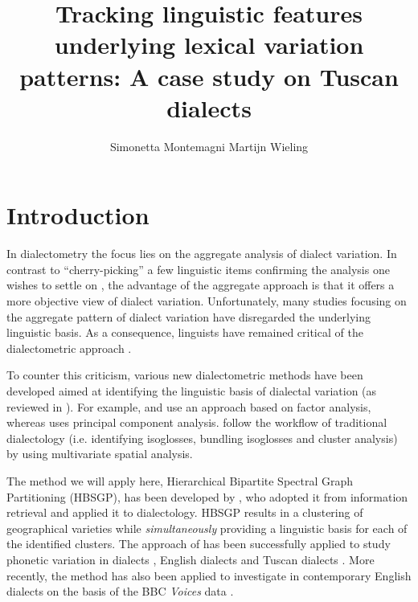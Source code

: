 \documentclass[output=paper]{LSP/langsci}
\author{Simonetta Montemagni\affiliation{Istituto di Linguistica Computazionale “Antonio Zampolli”, ILC-CNR} \lastand Martijn Wieling\affiliation{University of Groningen, CLCG}}
\title{Tracking linguistic features underlying lexical variation patterns: {A} case study on {T}uscan dialects}
\begin{document}
 
 
% 

% 
% 
% 
% 

\section{Introduction}
In dialectometry \citep{seguy_relation_1971} the focus lies on the aggregate analysis of dialect variation. In contrast to “cherry-picking” a few linguistic items confirming the analysis one wishes to settle on \citep{nerbonne_data-driven_2009}, the advantage of the aggregate approach is that it offers a more objective view of dialect variation. Unfortunately, many studies focusing on the aggregate pattern of dialect variation have disregarded the underlying linguistic basis. As a consequence, linguists have remained critical of the dialectometric approach \citep{schneider_qualitative_1988,woolhiser_political_2005, loporcaro_profilo_2009}. 

To counter this criticism, various new dialectometric methods have been developed aimed at identifying the linguistic basis of dialectal variation (as reviewed in \citealt{wieling_advances_2015}). For example, \citet{nerbonne_identifying_2006} and \citet{proll_latente_inpress} use an approach based on factor analysis, whereas \citet{shackleton_english-american_2005} uses principal component analysis. \citet{grieve_statistical_2011} follow the workflow of traditional dialectology (i.e. identifying isoglosses, bundling isoglosses and cluster analysis) by using multivariate spatial analysis. 

The method we will apply here, Hierarchical Bipartite Spectral Graph Partitioning (HBSGP), has been developed by \citet{wieling_bipartite_2009,wieling_hierarchical_2010, wieling_bipartite_2011}, who adopted it from information retrieval \citep{dhillon_co-clustering_2001} and applied it to dialectology. HBSGP results in a clustering of geographical varieties while \emph{simultaneously }providing a linguistic basis for each of the identified clusters. The approach of \citet{wieling_bipartite_2011} has been successfully applied to study phonetic variation in  dialects \citep{wieling_bipartite_2011}, English dialects \citep{wieling_analyzing_2013} and Tuscan dialects \citep{montemagni_patterns_2012,montemagni_synchronic_2013}. More recently, the method has also been applied to investigate  in contemporary English dialects on the basis of the BBC \textit{Voices} data \citep{wieling_lexical_2014}.
\end{document}
